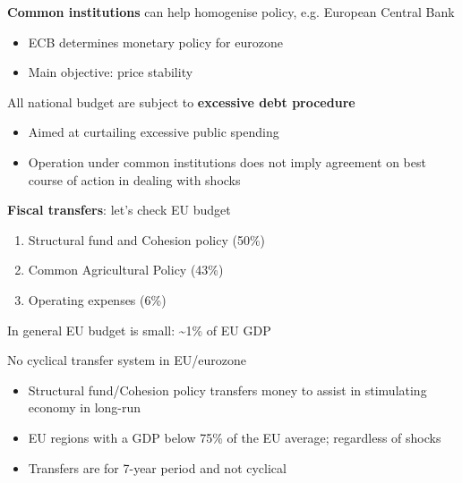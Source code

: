 \documentclass{beamer}
\begin{document}
\begin{frame}
  \textbf{Common institutions} can help homogenise policy, e.g. European Central Bank
  \begin{itemize}
    \item ECB determines monetary policy for eurozone
    \item Main objective: price stability
  \end{itemize}
  \medskip
  All national budget are subject to \textbf{excessive debt procedure}   
  \begin{itemize}
    \item Aimed at curtailing excessive public spending
    \item Operation under common institutions does not imply agreement on best course of action in dealing with shocks
  \end{itemize}
\end{frame}

\begin{frame}
  \textbf{Fiscal transfers}: let's check EU budget
  \begin{enumerate}
    \item Structural fund and Cohesion policy (50\%)
    \item Common Agricultural Policy (43\%)
    \item Operating expenses (6\%)
  \end{enumerate}
  \medskip
  In general EU budget is small: \textasciitilde 1\% of EU GDP
\end{frame}

\begin{frame}
 No cyclical transfer system in EU/eurozone  
  \begin{itemize}
    \item Structural fund/Cohesion policy transfers money to assist in stimulating economy in long-run
    \item EU regions with a GDP below 75\% of the EU average; regardless of shocks
    \item Transfers are for 7-year period and not cyclical
  \end{itemize}
\end{frame}
\end{document}
